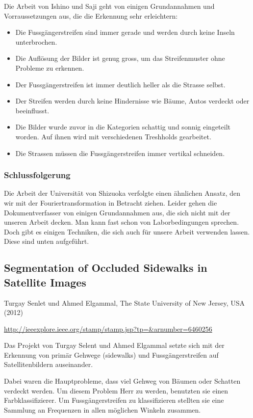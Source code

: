 Die Arbeit von Ishino und Saji geht von einigen Grundannahmen und Vorraussetzungen aus, die die Erkennung sehr erleichtern:

\begin{itemize}
	\item Die Fussgängerstreifen sind immer gerade und werden durch keine Inseln unterbrochen.
	\item Die Auflösung der Bilder ist genug gross, um das Streifenmuster ohne Probleme zu erkennen.
	\item Der Fussgängerstreifen ist immer deutlich heller als die Strasse selbst.
	\item Der Streifen werden durch keine Hindernisse wie Bäume, Autos verdeckt oder beeinflusst.
	\item Die Bilder wurde zuvor in die Kategorien schattig und sonnig eingeteilt worden. Auf ihnen wird mit verschiedenen Treshholds gearbeitet.
	\item Die Strassen müssen die Fussgängerstreifen immer vertikal schneiden.
\end{itemize}

\subsubsection{Schlussfolgerung}
Die Arbeit der Universität von Shizuoka verfolgte einen ähnlichen Ansatz, den wir mit der Fouriertransformation in Betracht ziehen. Leider gehen die Dokumentverfasser von einigen Grundannahmen aus, die sich nicht mit der unseren Arbeit decken. Man kann fast schon von Laborbedingungen sprechen.
Doch gibt es einigen Techniken, die sich auch für unsere Arbeit verwenden lassen. Diese sind unten aufgeführt.

\subsection{Segmentation of Occluded Sidewalks in Satellite Images}
Turgay Senlet und Ahmed Elgammal, The State University of New Jersey, USA (2012) \newline

\onehalfspacing
\url{http://ieeexplore.ieee.org/stamp/stamp.jsp?tp=\&arnumber=6460256}
\onehalfspacing
\newline


Das Projekt von Turgay Selent und Ahmed Elgammal setzte sich mit der Erkennung von primär Gehwege (sidewalks) und Fussgängerstreifen auf Satellitenbildern auseinander.

Dabei waren die Hauptprobleme, dass viel Gehweg von Bäumen oder Schatten verdeckt werden. Um diesem Problem Herr zu werden, benutzten sie einen Farbklassifizierer.
Um Fussgängerstreifen zu klassifizieren stellten sie eine Sammlung an Frequenzen in allen möglichen Winkeln zusammen. 


